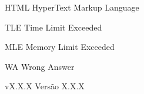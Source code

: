 \begin{siglas}
  \item[HTML] HyperText Markup Language
  \item[TLE] Time Limit Exceeded
  \item[MLE] Memory Limit Exceeded
  \item[WA] Wrong Answer 
  \item[vX.X.X] Versão X.X.X
\end{siglas}
